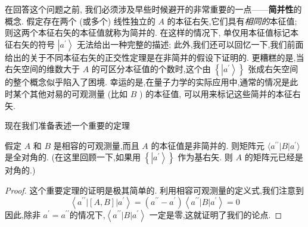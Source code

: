 	在回答这个问题之前, 我们必须涉及早些时候避开的非常重要的一点——\textbf{简并性}的概念. 假定存在两个 (或多个) 线性独立的 $A$ 的本征右矢,它们具有\textit{相同的}本征值; 则这两个本征右矢的本征值就称为简并的. 在这样的情况下, 单仅用本征值标记本征右矢的符号 $\left| {a}^{\prime }\right\rangle$ 无法给出一种完整的描述; 此外,我们还可以回忆一下,我们前面给出的关于不同本征右矢的正交性定理是在非简并的假设下证明的. 更糟糕的是,当右矢空间的维数大于 $A$ 的可区分本征值的个数时,这个由 $\left\{ \left| {a}^{\prime }\right\rangle \right\}$ 张成右矢空间的整个概念似乎陷入了困境. 幸运的是,在量子力学的实际应用中,通常的情况是此时某个其他对易的可观测量 (比如 $B$ ) 的本征值, 可以用来标记这些简并的本征右矢.
	
	现在我们准备表述一个重要的定理
	\begin{theorem}\label{thm:1.3.1} 
		假定 $A$ 和 $B$ 是相容的可观测量,而且 $A$ 的本征值是非简并的. 则矩阵元 $\langle {a}^{\prime \prime } \left| B\right| {a}^{\prime }\rangle$ 是全对角的. (在这里回顾一下,如果用 $\left\{ \left| {a}^{\prime }\right\rangle \right\}$ 作为基右矢. 则 $A$ 的矩阵元已经是对角的.)
	\end{theorem}
	
	\begin{proof}
		这个重要定理的证明是极其简单的. 利用相容可观测量的定义式,我们注意到
		\begin{equation}
			\left\langle {{a}^{\prime \prime }\left| \left\lbrack {A, B}\right\rbrack \right| {a}^{\prime }}\right\rangle = \left( {{a}^{\prime \prime } - {a}^{\prime }}\right) \left\langle {{a}^{\prime \prime }\left| B\right| {a}^{\prime }}\right\rangle = 0
		\end{equation}
		因此,除非 ${a}^{\prime } = {a}^{\prime \prime }$的情况下,$\left\langle {{a}^{\prime \prime }\left| B\right| {a}^{\prime }}\right\rangle$ 一定是零,这就证明了我们的论点.
	\end{proof}
	
